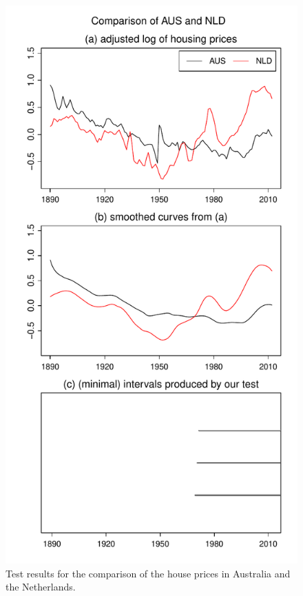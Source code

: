 \documentclass[12pt]{article}
\begin{document}
\begin{figure}
\begin{minipage}[t]{0.24\textwidth}
\includegraphics[width=\textwidth]{output/plots/hp/AUS_vs_NLD}
\caption{Test results for the comparison of the house prices in Australia and the Netherlands.}\label{fig:hp:Australia:Netherlands}
\end{minipage}

\end{figure}
\end{document}

